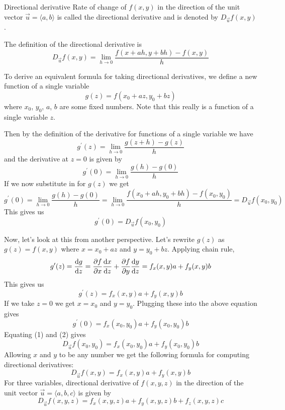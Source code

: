 \begin{defn}{Directional derivative}{}
Rate of change of $f(x,y)$ in the direction of the unit vector $\vec{u}=\langle{a,b}\rangle$ is called the directional derivative and is denoted by $D_{\vec{u}} f(x,y)$.

The definition of the directional derivative is
\begin{equation}
{D_{\vec u}}f(x,y) = \lim_{h\to0} \frac{f(x + ah,y + bh) - f(x,y)}{h}
\end{equation}
\end{defn}

To derive an equivalent formula for taking directional derivatives, we define a new function of a single variable
\[ g(z) = f(x_0+az,y_0+bz) \]
where $x_0$, $y_0$, $a$, $b$ are some fixed numbers. Note that this really is a function of a single variable $z$.

Then by the definition of the derivative for functions of a single variable we have
\[ g^\prime(z) = \lim_{h\to0} \frac{g(z+h)-g(z)}{h} \]
and the derivative at $z=0$ is given by
\[ g^\prime(0) = \lim_{h\to0} \frac{g(h)-g(0)}{h} \]
If we now substitute in for $g(z)$ we get
\[ g^\prime(0) = \lim_{h\to0} \frac{g(h)-g(0)}{h} = \lim_{h\to0} \frac{f(x_0+ah,y_0+bh) - f(x_0,y_0)}{h} = D_{\vec u}f(x_0,y_0) \]
This gives us
\begin{equation}\tag{1}
g^\prime(0) = D_{\vec u}f(x_0,y_0)
\end{equation}

Now, let's look at this from another perspective. Let's rewrite $g(z)$ as $g(z) = f(x,y)$ where $x=x_0+az$ and $y=y_0+bz$. Applying chain rule,
\[ g^\prime(z) = \odv{g}{z} = \pdv{f}{x}\odv{x}{z} + \pdv{f}{y}\odv{y}{z} = f_x (x,y)a + f_y (x,y)b \]
This gives us
\[ g^\prime(z) = f_x (x,y)a + f_y (x,y)b \]
If we take $z=0$ we get $x=x_0$ and $y=y_0$. Plugging these into the above equation gives
\begin{equation}\tag{2}
g^\prime(0) = f_x (x_0,y_0)a + f_y (x_0,y_0)b
\end{equation}
Equating (1) and (2) gives
\[ {D_{\vec u}}f(x_0,y_0) = f_x(x_0,y_0)a + f_y(x_0,y_0)b \]
Allowing $x$ and $y$ to be any number we get the following formula for computing directional derivatives:
\[ {D_{\vec u}}f(x,y) = f_x(x,y)a + f_y(x,y)b \]
For three variables, directional derivative of $f(x,y,z)$ in the direction of the unit vector $\vec{u}=\langle{a,b,c}\rangle$ is given by
\begin{equation}
{D_{\vec u}}f(x,y,z) = f_x (x,y,z)a + f_y (x,y,z)b + f_z (x,y,z)c
\end{equation}

